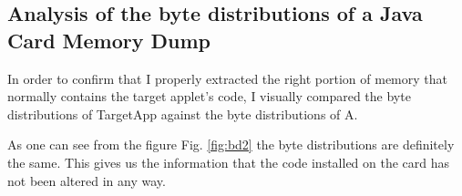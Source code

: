 


\subsection{Analysis of the byte distributions of a Java Card Memory Dump}

In order to confirm that I properly extracted the right portion of memory that normally contains
the target applet's code, I visually compared the byte distributions of TargetApp against the byte
distributions of A. 

As one can see from the figure Fig. \ref{fig:bd2} the byte distributions are definitely the same.
This gives us the information that the code installed on the card has not been altered in any way.


